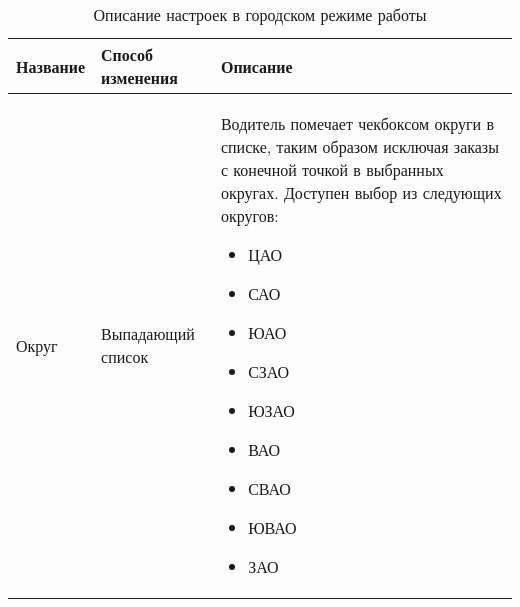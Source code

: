       \begin{table}
          \begin{center}
          \label{driver_app_robot_tab_table_town_mode}
          \caption {Описание настроек в городском режиме работы}
          \setlength{\extrarowheight}{2mm}
          \begin{tabular}{|p{4cm}|p{3cm}|p{8cm}|}

            \hline     \textbf{Название}&\textbf{Способ изменения}&\textbf{Описание} \\ [2mm]

            \hline   Округ & Выпадающий список & Водитель помечает чекбоксом округи в списке, таким образом исключая заказы с конечной точкой в выбранных округах. Доступен выбор из следующих округов: \begin{itemize} \item ЦАО \item САО \item ЮАО \item СЗАО \item ЮЗАО \item ВАО \item СВАО \item ЮВАО \item ЗАО \end{itemize} \\ [2mm]

            \hline
          \end{tabular}
          \end{center}
      \end{table}        

